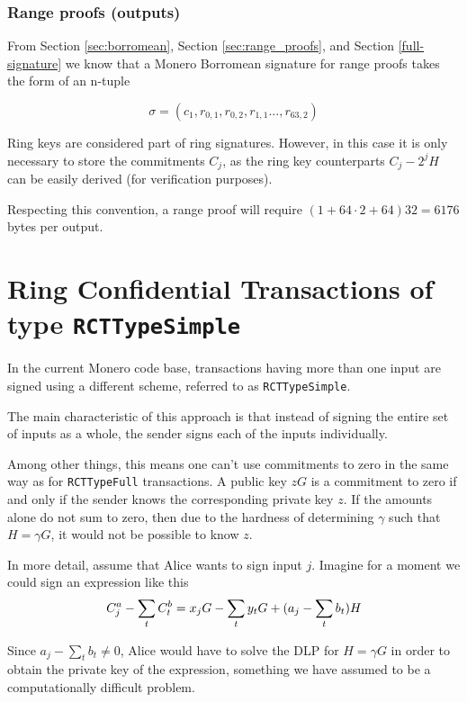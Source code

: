 \subsubsection*{Range proofs (outputs)}
\label{range-proofs-space}

From Section \ref{sec:borromean}, Section \ref{sec:range_proofs}, and Section \ref{full-signature} we know that a Monero Borromean signature for range proofs takes the form of an n-tuple

\[\sigma = (c_1, r_{0, 1}, r_{0, 2}, r_{1, 1}..., r_{63, 2} )  \]

Ring keys are considered part of ring signatures. However, in this case it is only necessary to store the commitments $C_j$, as the ring key counterparts $C_j - 2^j H$ can be easily derived (for verification purposes). 

Respecting this convention, a range proof will require \( ( 1 + 64 \cdot 2 + 64  ) 32 = 6176\) bytes per output.
\\


\section{ Ring Confidential Transactions of type {\tt RCTTypeSimple}}
\label{sec:RCTTypeSimple}

In the current Monero code base, transactions having more than one input are signed using a different scheme, referred to as {\tt RCTTypeSimple}.

The main characteristic of this approach is that instead of signing the entire set of inputs as a whole, the sender signs each of the inputs individually.

Among other things, this means one can’t use commitments to zero in the same way as for {\tt RCTTypeFull} transactions. A public key $z G$ is a commitment to zero if and only if the sender knows the corresponding private key $z$. If the amounts alone do not sum to zero, then due to the hardness of determining $\gamma$ such that $H = \gamma G$, it would not be possible to know $z$.

In more detail, assume that Alice wants to sign input $j$. Imagine for a moment we could sign an expression like this\\
\[  C^a_{j} - \sum\limits_t C^b_{t} \\
= x_j G -  \sum_t y_t G + (a_j - \sum\limits_t  b_t) H \]

Since \(a_j - \sum\limits_t  b_t \ne 0\), Alice would have to solve the DLP for \(H = \gamma G\) in order to obtain the private key of the expression, something we have assumed to be a computationally difficult problem.


